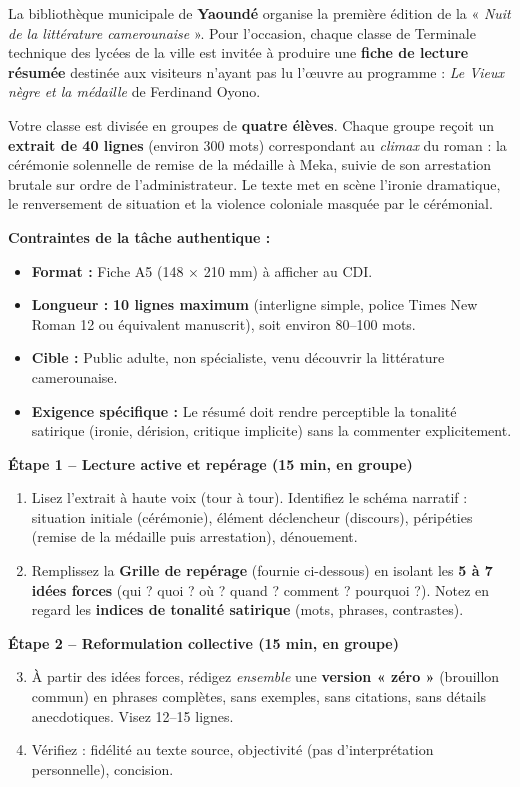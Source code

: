 \documentclass[11pt]{article}
\newcommand{\cle}[1]{{\popxbold\color{popdark}#1}}
\newcounter{popsec}
\newcounter{popsub}
\newcommand{\courssub}[1]{%
  \stepcounter{popsub}%
  \par\vspace{9pt}\noindent{\popxbold\fontsize{11.5}{13}\selectfont\color{popink}{\color{poporange}\thepopsec.\thepopsub}\hspace{6pt}#1}\par\nopagebreak\vspace{4pt}
}
\begin{document}
\courssub{Situation}
La bibliothèque municipale de \textbf{Yaoundé} organise la première édition de la « \emph{Nuit de la littérature camerounaise} ». Pour l'occasion, chaque classe de Terminale technique des lycées de la ville est invitée à produire une \textbf{fiche de lecture résumée} destinée aux visiteurs n'ayant pas lu l'œuvre au programme : \emph{Le Vieux nègre et la médaille} de Ferdinand Oyono.

Votre classe est divisée en groupes de \textbf{quatre élèves}. Chaque groupe reçoit un \textbf{extrait de 40 lignes} (environ 300 mots) correspondant au \emph{climax} du roman : la cérémonie solennelle de remise de la médaille à Meka, suivie de son arrestation brutale sur ordre de l'administrateur. Le texte met en scène l'ironie dramatique, le renversement de situation et la violence coloniale masquée par le cérémonial.

\textbf{Contraintes de la tâche authentique :}
\begin{itemize}
    \item \textbf{Format :} Fiche A5 (148 $\times$ 210 mm) à afficher au CDI.
    \item \textbf{Longueur :} \textbf{10 lignes maximum} (interligne simple, police Times New Roman 12 ou équivalent manuscrit), soit environ 80--100 mots.
    \item \textbf{Cible :} Public adulte, non spécialiste, venu découvrir la littérature camerounaise.
    \item \textbf{Exigence spécifique :} Le résumé doit rendre perceptible la \cle{tonalité satirique} (ironie, dérision, critique implicite) sans la commenter explicitement.
\end{itemize}

\courssub{Consignes}
\textbf{Étape 1 -- Lecture active et repérage (15 min, en groupe)}
\begin{enumerate}
    \item Lisez l'extrait à haute voix (tour à tour). Identifiez le \cle{schéma narratif} : situation initiale (cérémonie), élément déclencheur (discours), péripéties (remise de la médaille puis arrestation), dénouement.
    \item Remplissez la \textbf{Grille de repérage} (fournie ci-dessous) en isolant les \textbf{5 à 7 idées forces} (qui ? quoi ? où ? quand ? comment ? pourquoi ?). Notez en regard les \textbf{indices de tonalité satirique} (mots, phrases, contrastes).
\end{enumerate}

\textbf{Étape 2 -- Reformulation collective (15 min, en groupe)}
\begin{enumerate}
    \setcounter{enumi}{2}
    \item À partir des idées forces, rédigez \emph{ensemble} une \textbf{version « zéro »} (brouillon commun) en phrases complètes, sans exemples, sans citations, sans détails anecdotiques. Visez 12--15 lignes.
    \item Vérifiez : \cle{fidélité} au texte source, \cle{objectivité} (pas d'interprétation personnelle), \cle{concision}.
\end{enumerate}
\end{document}
